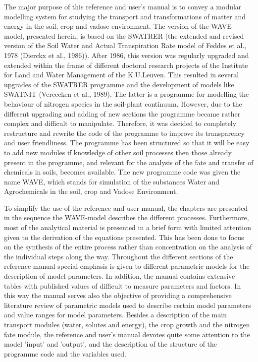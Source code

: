 The major purpose of this reference and user's manual is to convey a modular modelling system for studying the transport and transformations of matter and energy in the soil, crop and vadose environment. The version of the WAVE model, presented herein, is based on the SWATRER (the extended and revised version of the Soil Water and Actual Transpiration Rate model of Feddes et al., 1978 (Dierckx et al., 1986)). After 1986, this version was regularly upgraded and extended within the frame of different doctoral research projects of the Institute for Land and Water Management of the K.U.Leuven. This resulted in several upgrades of the SWATRER programme and the development of models like SWATNIT (Vereecken et al., 1989). The latter is a programme for modelling the behaviour of nitrogen species in the soil-plant continuum. However, due to the different upgrading and adding of new sections the programme became rather complex and difficult to manipulate. Therefore, it was decided to completely restructure and rewrite the code of the programme to improve its transparency and user friendliness. The programme has been structured so that it will be easy to add new modules if knowledge of other soil processes then those already present in the programme, and relevant for the analysis of the fate and transfer of chemicals in soils, becomes available. The new programme code was given the name WAVE, which stands for simulation of the substances Water and Agrochemicals in the soil, crop and Vadose Environment.

To simplify the use of the reference and user manual, the chapters are presented in the sequence the WAVE-model describes the different processes. Furthermore, most of the analytical material is presented in a brief form with limited attention given to the derivation of the equations presented. This has been done to focus on the synthesis of the entire process rather than concentration on the analysis of the individual steps along the way. Throughout the different sections of the reference manual special emphasis is given to different parametric models for the description of model parameters. In addition, the manual contains extensive tables with published values of difficult to measure parameters and factors. In this way the manual serves also the objective of providing a comprehensive literature review of parametric models used to describe certain model parameters and value ranges for model parameters. Besides a description of the main transport modules (water, solutes and energy), the crop growth and the nitrogen fate module, the reference and user's manual devotes quite some attention to the model 'input' and 'output', and the description of the structure of the programme code and the variables used.\\

